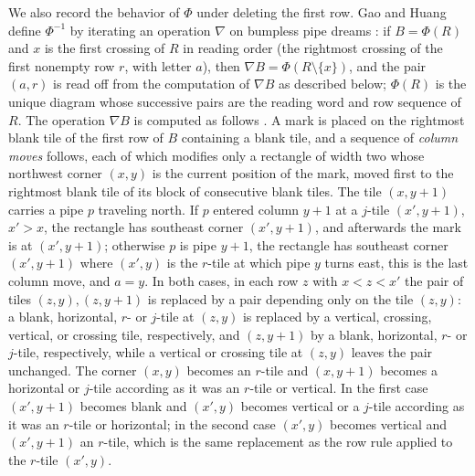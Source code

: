 \documentclass{amsart}
\theoremstyle{definition}
\theoremstyle{remark}
\numberwithin{equation}{subsection}
\begin{document}
We also record the behavior of $\Phi$ under deleting the first row. Gao and Huang define $\Phi^{-1}$ by iterating an operation $\nabla$ on bumpless pipe dreams \cite[Definitions~3.1 and~3.3]{GaoHuang2023}: if $B=\Phi(R)$ and $x$ is the first crossing of $R$ in reading order (the rightmost crossing of the first nonempty row $r$, with letter $a$), then $\nabla B=\Phi(R\setminus\{x\})$, and the pair $(a,r)$ is read off from the computation of $\nabla B$ as described below; $\Phi(R)$ is the unique diagram whose successive pairs are the reading word and row sequence of $R$. The operation $\nabla B$ is computed as follows \cite[Definition~3.1, Figures~2 and~3]{GaoHuang2023}. A mark is placed on the rightmost blank tile of the first row of $B$ containing a blank tile, and a sequence of \emph{column moves} follows, each of which modifies only a rectangle of width two whose northwest corner $(x,y)$ is the current position of the mark, moved first to the rightmost blank tile of its block of consecutive blank tiles. The tile $(x,y+1)$ carries a pipe $p$ traveling north. If $p$ entered column $y+1$ at a $j$-tile $(x',y+1)$, $x'>x$, the rectangle has southeast corner $(x',y+1)$, and afterwards the mark is at $(x',y+1)$; otherwise $p$ is pipe $y+1$, the rectangle has southeast corner $(x',y+1)$ where $(x',y)$ is the $r$-tile at which pipe $y$ turns east, this is the last column move, and $a=y$. In both cases, in each row $z$ with $x<z<x'$ the pair of tiles $(z,y),(z,y+1)$ is replaced by a pair depending only on the tile $(z,y)$: a blank, horizontal, $r$- or $j$-tile at $(z,y)$ is replaced by a vertical, crossing, vertical, or crossing tile, respectively, and $(z,y+1)$ by a blank, horizontal, $r$- or $j$-tile, respectively, while a vertical or crossing tile at $(z,y)$ leaves the pair unchanged. The corner $(x,y)$ becomes an $r$-tile and $(x,y+1)$ becomes a horizontal or $j$-tile according as it was an $r$-tile or vertical. In the first case $(x',y+1)$ becomes blank and $(x',y)$ becomes vertical or a $j$-tile according as it was an $r$-tile or horizontal; in the second case $(x',y)$ becomes vertical and $(x',y+1)$ an $r$-tile, which is the same replacement as the row rule applied to the $r$-tile $(x',y)$.
\end{document}
